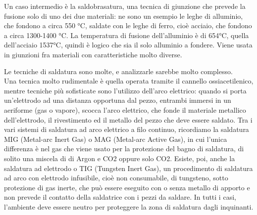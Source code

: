 Un caso intermedio è la saldobrasatura, una tecnica di giunzione che prevede la fusione solo di uno dei due materiali: ne sono un esempio le leghe di alluminio, che fondono a circa 550 °C, saldate con le leghe di ferro, cioè acciaio, che fondono a circa 1300-1400 °C. La temperatura di fusione dell’alluminio è di 654°C, quella dell’acciaio 1537°C, quindi è logico che sia il solo alluminio a fondere. Viene usata in giunzioni fra materiali con caratteristiche molto diverse.

Le tecniche di saldatura sono molte, e analizzarle sarebbe molto complesso.\\
Una tecnica molto rudimentale è quella operata tramite il cannello ossiacetilenico, mentre tecniche più sofisticate sono l’utilizzo dell’arco elettrico: quando si porta un’elettrodo ad una distanza opportuna dal pezzo, entrambi immersi in un aeriforme (gas o vapore), scocca l'arco elettrico, che fonde il materiale metallico dell'elettrodo, il rivestimento ed il metallo del pezzo che deve essere saldato. Tra i vari sistemi di saldatura ad arco elettrico a filo continuo, ricordiamo la saldatura MIG (Metal-arc Inert Gas) o MAG (Metal-arc Active Gas), in cui l’unica differenza è nel gas che viene usato per la protezione del bagno di saldatura, di solito una miscela di di Argon e CO2 oppure solo CO2. Esiste, poi, anche la saldatura ad elettrodo o TIG (Tungsten Inert Gas), un procedimento di saldatura ad arco con elettrodo infusibile, cioè non consumabile, di tungsteno, sotto protezione di gas inerte, che può essere eseguito con o senza metallo di apporto e non prevede il contatto della saldatrice con i pezzi da saldare. In tutti i casi, l’ambiente deve essere neutro per proteggere la zona di saldatura dagli inquinanti.

